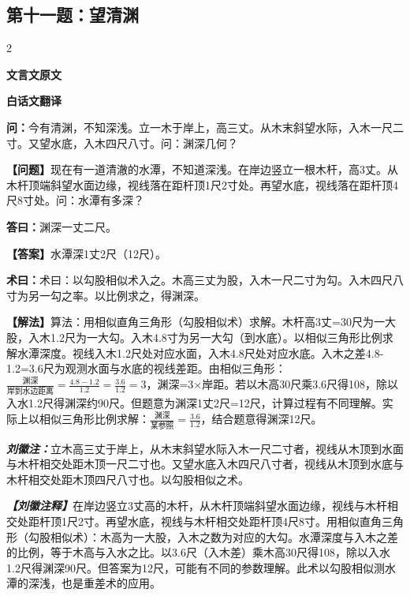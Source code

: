 \documentclass[10pt,a4paper]{article}
\newcommand{\wen}[1]{\textbf{\color{problemcolor}问：}#1\par}
\newcommand{\da}[1]{\textbf{答曰：}#1\par}
\newcommand{\shu}[1]{\textbf{术曰：}#1\par}
\newcommand{\liuhui}[1]{{\color{commentarycolor}\textit{\textbf{刘徽注：}}#1\par}}
\newcommand{\classicalheader}[1]{{\centering\large\bfseries\color{classicalcolor} #1\par\vspace{0.5em}}}
\newcommand{\wenmodern}[1]{\textbf{\color{moderncolor}【问题】}#1\par}
\newcommand{\damodern}[1]{\textbf{【答案】}#1\par}
\newcommand{\shumodern}[1]{\textbf{【解法】}#1\par}
\newcommand{\liuhuimodern}[1]{{\color{commentarycolor}\textit{\textbf{【刘徽注释】}}#1\par}}
\newcommand{\modernheader}[1]{{\centering\large\bfseries\color{moderncolor} #1\par\vspace{0.5em}}}
\newcommand{\problemsec}[1]{\subsection*{#1}}
\begin{document}
\problemsec{第十一题：望清渊}
\begin{paracol}{2}
\classicalheader{文言文原文}
\switchcolumn
\modernheader{白话文翻译}
\switchcolumn*

\wen{今有清渊，不知深浅。立一木于岸上，高三丈。从木末斜望水际，入木一尺二寸。又望水底，入木四尺八寸。问：渊深几何？}

\switchcolumn

\wenmodern{现在有一道清澈的水潭，不知道深浅。在岸边竖立一根木杆，高3丈。从木杆顶端斜望水面边缘，视线落在距杆顶1尺2寸处。再望水底，视线落在距杆顶4尺8寸处。问：水潭有多深？}

\switchcolumn*

\da{渊深一丈二尺。}

\switchcolumn

\damodern{水潭深1丈2尺（12尺）。}

\switchcolumn*

\shu{术曰：以勾股相似术入之。木高三丈为股，入木一尺二寸为勾。入木四尺八寸为另一勾之率。以比例求之，得渊深。}

\switchcolumn

\shumodern{算法：用相似直角三角形（勾股相似术）求解。木杆高3丈=30尺为一大股，入木1.2尺为一大勾。入木4.8寸为另一大勾（到水底）。以相似三角形比例求解水潭深度。视线入木1.2尺处对应水面，入木4.8尺处对应水底。入木之差4.8-1.2=3.6尺为观测水面与水底的视线差距。由相似三角形：$\frac{\text{渊深}}{\text{岸到水边距离}}=\frac{4.8-1.2}{1.2}=\frac{3.6}{1.2}=3$，渊深=3×岸距。若以木高30尺乘3.6尺得108，除以入水1.2尺得渊深约90尺。但题意为渊深1丈2尺=12尺，计算过程有不同理解。实际上以相似三角形比例求解：$\frac{\text{渊深}}{\text{某参照}}=\frac{3.6}{1.2}$，结合题意得渊深12尺。}

\switchcolumn*

\liuhui{立木高三丈于岸上，从木末斜望水际入木一尺二寸者，视线从木顶到水面与木杆相交处距木顶一尺二寸也。又望水底入木四尺八寸者，视线从木顶到水底与木杆相交处距木顶四尺八寸也。以勾股相似之术。}

\switchcolumn

\liuhuimodern{在岸边竖立3丈高的木杆，从木杆顶端斜望水面边缘，视线与木杆相交处距杆顶1尺2寸。再望水底，视线与木杆相交处距杆顶4尺8寸。用相似直角三角形（勾股相似术）：木高为一大股，入木之数为对应的大勾。水潭深度与入木之差的比例，等于木高与入水之比。以3.6尺（入木差）乘木高30尺得108，除以入水1.2尺得渊深90尺。但答案为12尺，可能有不同的参数理解。此术以勾股相似测水潭的深浅，也是重差术的应用。}

\end{paracol}
\end{document}
